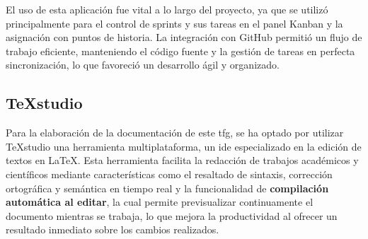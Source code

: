 	El uso de esta aplicación fue vital a lo largo del proyecto, ya que se utilizó principalmente para el control de sprints y sus tareas en el panel Kanban y la asignación con puntos de historia. La integración con GitHub permitió un flujo de trabajo eficiente, manteniendo el código fuente y la gestión de tareas en perfecta sincronización, lo que favoreció un desarrollo ágil y organizado. 
	
	\subsection{TeXstudio}
	Para la elaboración de la documentación de este \acrshort{tfg}, se ha optado por utilizar TeXstudio una herramienta multiplataforma, un \acrfull{ide} especializado en la edición de textos en LaTeX. Esta herramienta facilita la redacción de trabajos académicos y científicos mediante características como el resaltado de sintaxis, corrección ortográfica y semántica en tiempo real y la funcionalidad de \textbf{compilación automática al editar}, la cual permite previsualizar continuamente el documento mientras se trabaja, lo que mejora la productividad al ofrecer un resultado inmediato sobre los cambios realizados.
	
	
	
	

